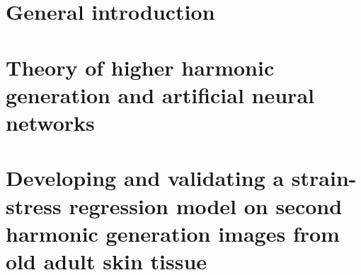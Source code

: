 \documentclass[
	fontsize=10pt, %
	twoside=false, %
	secnumdepth=2, %
	numbers=noenddot,
]{kaobook}
\begin{document}
\let\cleardoublepage\bigskip
\let\clearpage\bigskip

\listoftables %

\endgroup


\mainmatter %

\chapter{General introduction}\label{ch:general_introduction}




\chapter{Theory of higher harmonic generation and artificial neural networks}\label{ch:theory}





\chapter[Skinstression]{Developing and validating a strain-stress regression model on second harmonic generation images from old adult skin tissue}\label{ch:skinstression}
\end{document}
